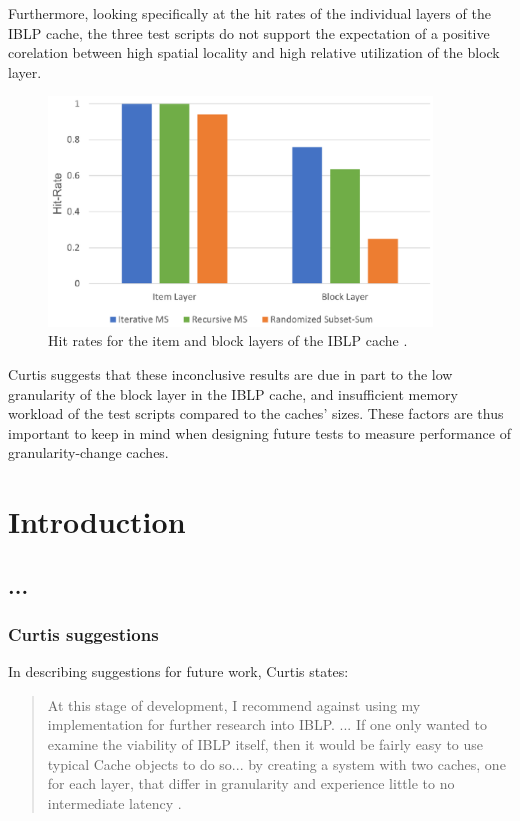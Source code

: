 \documentclass[12pt,twoside]{reedthesis}
\begin{document}
	Furthermore, looking specifically at the hit rates of the individual layers of the IBLP cache, the three test scripts do not support the expectation of a positive corelation between high spatial locality and high relative utilization of the block layer.

	\begin{figure}[H]
		\centering
		\includegraphics[height=2.4in]{figures/curtis_layer_hit_rates.png}
		\caption{Hit rates for the item and block layers of the IBLP cache \cite{curtis}.}
	\end{figure}

	Curtis suggests that these inconclusive results are due in part to the low granularity of the block layer in the IBLP cache, and insufficient memory workload of the test scripts compared to the caches' sizes. These factors are thus important to keep in mind when designing future tests to measure performance of granularity-change caches.


\chapter{Introduction}

\section{...}

	\subsection*{Curtis suggestions}

	In describing suggestions for future work, Curtis states: \begin{quote}
		At this stage of development, I recommend against using my implementation for further research into IBLP. ... If one only wanted to examine the viability of IBLP itself, then it would be fairly easy to use typical Cache objects to do so... by creating a system with two caches, one for each layer, that differ in granularity and experience little to no intermediate latency \cite{curtis}.
	\end{quote}
\end{document}
